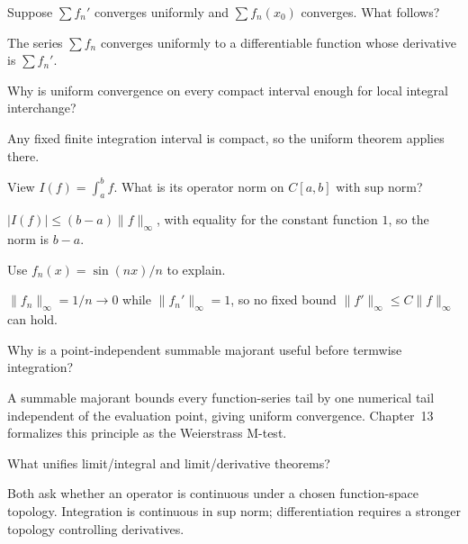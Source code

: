 \begin{problem}\label{prob:ii12-problem-07}
Suppose $\sum f_n'$ converges uniformly and $\sum f_n(x_0)$ converges. What follows?
\end{problem}
\begin{solution}
The series $\sum f_n$ converges uniformly to a differentiable function whose derivative is $\sum f_n'$.
\end{solution}

\begin{problem}\label{prob:ii12-problem-08}
Why is uniform convergence on every compact interval enough for local integral interchange?
\end{problem}
\begin{solution}
Any fixed finite integration interval is compact, so the uniform theorem applies there.
\end{solution}

\begin{problem}\label{prob:ii12-problem-09}
View $I(f)=\int_a^bf$. What is its operator norm on $C[a,b]$ with sup norm?
\end{problem}
\begin{solution}
$|I(f)|\le(b-a)\|f\|_\infty$, with equality for the constant function $1$, so the norm is $b-a$.
\end{solution}

\begin{problem}\label{prob:ii12-problem-10}
Use $f_n(x)=\sin(nx)/n$ to explain.
\end{problem}
\begin{solution}
$\|f_n\|_\infty=1/n\to0$ while $\|f_n'\|_\infty=1$, so no fixed bound $\|f'\|_\infty\le C\|f\|_\infty$ can hold.
\end{solution}

\begin{problem}\label{prob:ii12-problem-11}
Why is a point-independent summable majorant useful before termwise integration?
\end{problem}
\begin{solution}
A summable majorant bounds every function-series tail by one numerical tail independent of the evaluation point, giving uniform convergence. Chapter~13 formalizes this principle as the Weierstrass M-test.
\end{solution}

\begin{problem}\label{prob:ii12-problem-12}
What unifies limit/integral and limit/derivative theorems?
\end{problem}
\begin{solution}
Both ask whether an operator is continuous under a chosen function-space topology. Integration is continuous in sup norm; differentiation requires a stronger topology controlling derivatives.
\end{solution}

